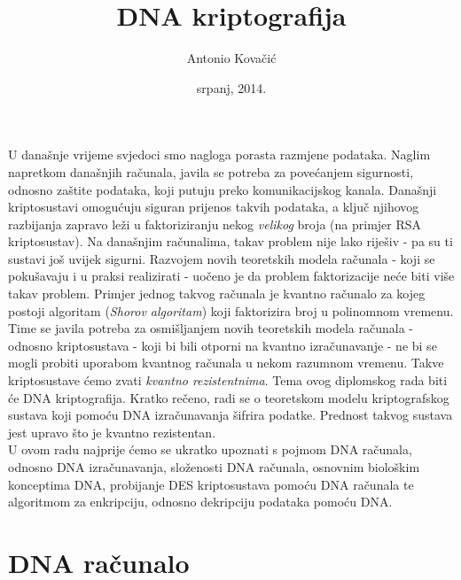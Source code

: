 \documentclass[a4paper,oneside,12pt]{memoir} %
\title{DNA kriptografija}
\author{Antonio Kovačić}
\date{srpanj, 2014.}  %
\begin{document}
\begin{spacing}{1.5}
\frontmatter


\begin{intro}

U današnje vrijeme svjedoci smo nagloga porasta razmjene podataka. Naglim napretkom današnjih računala, javila se potreba za povećanjem sigurnosti, odnosno zaštite podataka, koji putuju preko komunikacijskog kanala. Današnji kriptosustavi omogućuju siguran prijenos takvih podataka, a ključ njihovog razbijanja zapravo leži u faktoriziranju nekog \textit{velikog} broja (na primjer \textsc{RSA} kriptosustav). Na današnjim računalima, takav problem nije lako riješiv - pa su ti sustavi još uvijek sigurni. Razvojem novih teoretskih modela računala - koji se pokušavaju i u praksi realizirati - uočeno je da problem faktorizacije neće biti više takav problem. Primjer jednog takvog računala je kvantno računalo za kojeg postoji algoritam (\textit{Shorov algoritam}) koji faktorizira broj u polinomnom vremenu.
Time se javila potreba za osmišljanjem  novih teoretskih modela računala - odnosno kriptosustava - koji bi bili otporni na kvantno izračunavanje - ne bi se mogli probiti uporabom kvantnog računala u nekom razumnom vremenu. Takve kriptosustave ćemo zvati \textit{kvantno rezistentnima}.
Tema ovog diplomskog rada biti će DNA kriptografija. Kratko rečeno, radi se o teoretskom modelu kriptografskog sustava koji pomoću DNA izračunavanja šifrira podatke. Prednost takvog sustava jest upravo što je kvantno rezistentan.\\[0.2cm]
U ovom radu najprije ćemo se ukratko upoznati s pojmom DNA računala, odnosno DNA izračunavanja, složenosti DNA računala, osnovnim biološkim konceptima DNA, probijanje DES kriptosustava pomoću DNA računala te algoritmom za enkripciju, odnosno dekripciju podataka pomoću DNA.
\end{intro}
\chapter{DNA računalo}

\end{spacing}
\end{document}
